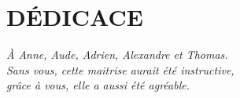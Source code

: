 \chapter*{DÉDICACE}\thispagestyle{headings}
\begin{flushright}
  \itshape
  À Anne, Aude, Adrien, Alexandre et Thomas.\\
  Sans vous, cette maitrise aurait été instructive,\\
  grâce à vous, elle a aussi été agréable.
\end{flushright}
